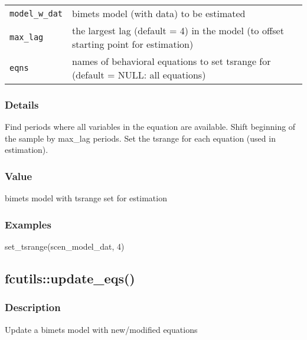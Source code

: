 \documentclass[
  letterpaper,
  DIV=11,
  numbers=noendperiod]{scrreport}
\newenvironment{Shaded}{\begin{snugshade}}{\end{snugshade}}
\newcommand{\DecValTok}[1]{\textcolor[rgb]{0.68,0.00,0.00}{#1}}
\newcommand{\FunctionTok}[1]{\textcolor[rgb]{0.28,0.35,0.67}{#1}}
\newcommand{\NormalTok}[1]{\textcolor[rgb]{0.00,0.23,0.31}{#1}}
\begin{document}
\begin{longtable}[]{@{}ll@{}}
\toprule\noalign{}
\endhead
\bottomrule\noalign{}
\endlastfoot
\texttt{model\_w\_dat} & bimets model (with data) to be estimated \\
\texttt{max\_lag} & the largest lag (default = 4) in the model (to
offset starting point for estimation) \\
\texttt{eqns} & names of behavioral equations to set tsrange for
(default = NULL: all equations) \\
\end{longtable}

\subsubsection{Details}\label{details-22}

Find periods where all variables in the equation are available. Shift
beginning of the sample by max\_lag periods. Set the tsrange for each
equation (used in estimation).

\subsubsection{Value}\label{value-71}

bimets model with tsrange set for estimation

\subsubsection{Examples}\label{examples-83}

\begin{Shaded}
\begin{Highlighting}[]
\FunctionTok{set\_tsrange}\NormalTok{(scen\_model\_dat, }\DecValTok{4}\NormalTok{)}
\end{Highlighting}
\end{Shaded}

\subsection{fcutils::update\_eqs()}\label{fcutilsupdate_eqs}

\subsubsection{Description}\label{description-85}

Update a bimets model with new/modified equations
\end{document}
